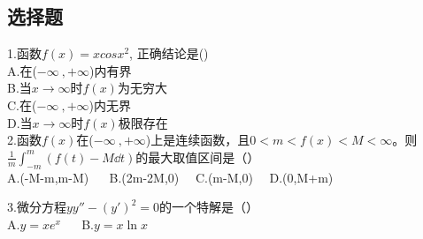 

\subsection{选择题}
1.函数$f(x)=xcosx^2$, 正确结论是()\\
A.在($-\infty~,+\infty$)内有界\\
B.当$x\to\infty$时$f(x)$为无穷大\\
C.在($-\infty~,+\infty$)内无界\\
D.当$x\to\infty$时$f(x)$极限存在\\

2.函数$f(x)$在($-\infty~,+\infty$)上是连续函数，且$0<m<f(x)<M<\infty$。则
$ \frac{1}{m} \int_{-m}^{m}(f(t)-M \dd{t})$的最大取值区间是（）\\
A.(-M-m,m-M) $\quad$ B.(2m-2M,0)$\quad$  C.(m-M,0)$\quad$  D.(0,M+m)

3.微分方程$y y''-(y')^2=0$的一个特解是（）\\
A.$y=xe^x$ $\quad$ B.$y=x\ln x$ $\quad$ 